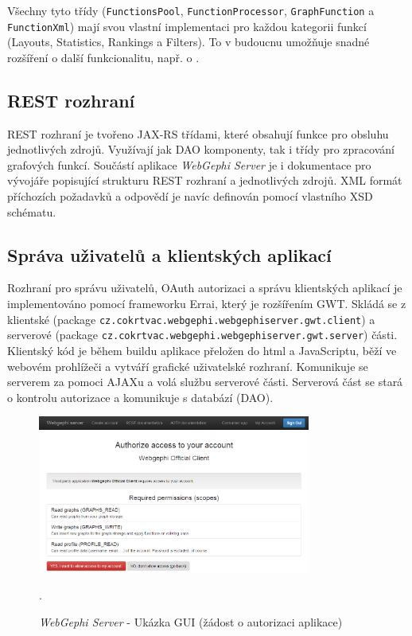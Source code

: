 \documentclass[thesis=M,czech]{FITthesis}[2014/05/6]
\begin{document}
Všechny tyto třídy (\texttt{FunctionsPool}, \texttt{FunctionProcessor}, \texttt{GraphFunction} a \texttt{FunctionXml}) mají svou vlastní implementaci pro každou kategorii funkcí (Layouts, Statistics, Rankings a Filters).
To v budoucnu umožňuje snadné rozšíření o další funkcionalitu, např. o .

\subsection{REST rozhraní}
REST rozhraní je tvořeno JAX-RS třídami, které obsahují funkce pro obsluhu jednotlivých zdrojů. Využívají jak DAO komponenty, tak i třídy pro zpracování grafových funkcí.
Součástí aplikace \textit{WebGephi Server} je i dokumentace pro vývojáře popisující strukturu REST rozhraní a jednotlivých zdrojů. XML formát příchozích požadavků a odpovědí je navíc 
definován pomocí vlastního XSD schématu.

\subsection{Správa uživatelů a klientských aplikací}
Rozhraní pro správu uživatelů, OAuth autorizaci a správu klientských aplikací je implementováno pomocí frameworku Errai, který je rozšířením GWT.
Skládá se z klientské (package \texttt{cz\-.cokrtvac\-.webgephi\-.webgephiserver\-.gwt\-.client}) a serverové (package \texttt{cz\-.cokrtvac\-.webgephi\-.webgephiserver\-.gwt\-.server}) části.
Klientský kód je během buildu aplikace přeložen do html a JavaScriptu, běží ve webovém prohlížeči a vytváří grafické uživatelské rozhraní. Komunikuje se serverem za pomoci AJAXu a volá 
službu serverové části. Serverová část se stará o kontrolu autorizace a komunikuje s databází (DAO).

\begin{figure}\centering
 	\includegraphics[width=0.8\textwidth]{images/prtsc/server-auth_request}
 	\caption[\textit{WebGephi Server} - Ukázka GUI (žádost o autorizaci aplikace)]{\textit{WebGephi Server} - Ukázka GUI (žádost o autorizaci aplikace)}.\label{fig:server-auth_request}
\end{figure}
\end{document}
